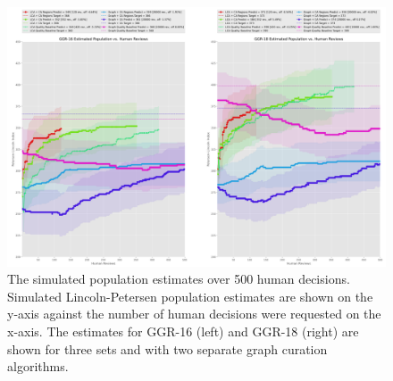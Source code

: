 \begin{figure}[!t]
    \begin{center}
        \includegraphics[width=0.9\linewidth]{resources/lca-decisions4.pdf}
    \end{center}
    \caption{The simulated population estimates over 500 human decisions.  Simulated Lincoln-Petersen population estimates are shown on the y-axis against the number of human decisions were requested on the x-axis.  The estimates for GGR-16 (left) and GGR-18 (right) are shown for three sets and with two separate graph curation algorithms.}
    \label{fig:ca-sim4}
\end{figure}

